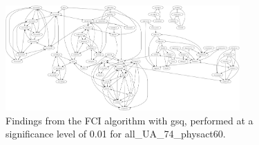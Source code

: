 \begin{figure}[htbp]
    \centering
    \includegraphics[width=0.8\textwidth]{Report/final_report/pictures/FCI_gsq_0.01_all_UA_74_physact60.png}
    \caption{Findings from the FCI algorithm with gsq, performed at a significance level of 0.01 for all_UA_74_physact60.}
    \label{fig:fci_gsq_0.01all_UA_74_physact60}
\end{figure}
